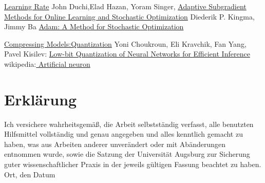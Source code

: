 \documentclass[12pt,a4paper]{scrartcl}
\numberwithin{equation}{section}
\begin{document}
\begin{thebibliography}{lem00}
		\href{https://en.wikipedia.org/wiki/Learning_rate}{Learning Rate}
		John Duchi,Elad Hazan, Yoram Singer,
		\href{http://www.jmlr.org/papers/volume12/duchi11a/duchi11a.pdf}{Adaptive Subgradient Methods for
			Online Learning and Stochastic Optimization}
		Diederik P. Kingma, Jimmy Ba
		\href{https://arxiv.org/abs/1412.6980}{Adam: A Method for Stochastic Optimization}
		
		\href{https://nervanasystems.github.io/distiller/quantization.html}{Compressing Models:Quantization}
		Yoni Choukroun, Eli Kravchik, Fan Yang, Pavel Kisilev:
			\href{https://arxiv.org/abs/1902.06822}{Low-bit Quantization of Neural Networks for Efficient Inference}
	wikipedia:\href{https://en.wikipedia.org/wiki/Artificial_neuron}{ Artificial neuron}
\end{thebibliography}

 
      

\newpage
  
 \thispagestyle{empty}


\vspace*{8cm}


\section*{Erklärung}

Ich  versichere  wahrheitsgemäß,  die  Arbeit selbstständig verfasst,  alle  benutzten  Hilfsmittel  vollständig  und  genau  angegeben  und  alles kenntlich  gemacht  zu  haben,  was  aus  Arbeiten  anderer  unverändert  oder  mit  Abänderungen entnommen  wurde,  sowie die Satzung  der  Universität Augsburg  zur  Sicherung guter wissenschaftlicher Praxis in der jeweils gültigen Fassung beachtet zu haben.
\\[2ex] 

\noindent
Ort, den Datum\\[5ex]

\end{document}

